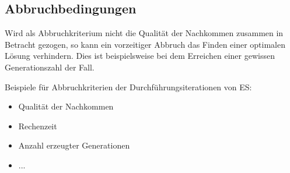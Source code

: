 \subsection{Abbruchbedingungen}

Wird als Abbruchkriterium nicht die Qualität der Nachkommen zusammen in Betracht gezogen, so kann ein vorzeitiger Abbruch das Finden einer optimalen Lösung verhindern.
Dies ist beispielsweise bei dem Erreichen einer gewissen Generationszahl der Fall.

Beispiele für Abbruchkriterien der Durchführungsiterationen von ES:
\begin{itemize}
	\item Qualität der Nachkommen
	\item Rechenzeit
	\item Anzahl erzeugter Generationen
	\item ...
\end{itemize}
